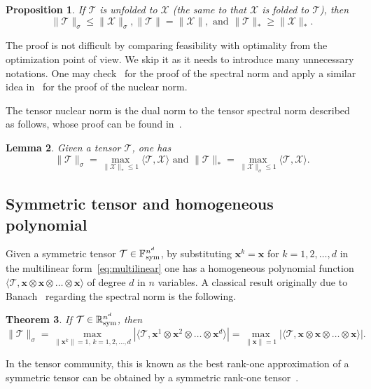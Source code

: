 \documentclass[11pt]{article}
\newtheorem{theorem}{Theorem}[section]
\newtheorem{lemma}[theorem]{Lemma}
\newtheorem{proposition}[theorem]{Proposition}
\newcommand{\R}{\mathbb{R}}
\newcommand{\BF}{\mathbb{F}\:\!}
\newcommand{\X}{\mathcal{X}}
\newcommand{\TT}{\mathcal{T}}
\newcommand{\bx}{\boldsymbol{x}}
\newcommand{\sym}{\textnormal{sym}}
\begin{document}
\begin{proposition}\label{thm:fold}
If $\TT$ is unfolded to $\X$ (the same to that $\X$ is folded to $\TT$), then
$$
\|\TT\|_\sigma\le\|\X\|_\sigma,
\|\TT\|=\|\X\|,\mbox{ and }
\|\TT\|_*\ge\|\X\|_*.
$$
\end{proposition}
The proof is not difficult by comparing feasibility with optimality from the optimization point of view. We skip it as it needs to introduce many unnecessary notations. One may check~\cite[Proposition 4.1]{WDFS17} for the proof of the spectral norm and apply a similar idea in~\cite[Proposition 4.1]{H15} for the proof of the nuclear norm.

The tensor nuclear norm is the dual norm to the tensor spectral norm described as follows, whose proof can be found in~\cite{LC14}.
\begin{lemma} \label{thm:dual}
Given a tensor $\TT$, one has %
$$
    \|\TT\|_\sigma=\max_{\|\X\|_*\le 1}\langle\TT,\X\rangle \mbox{ and }
    \|\TT\|_*=\max_{\|\X\|_\sigma\le 1}\langle\TT,\X\rangle.
$$
\end{lemma}

\subsection{Symmetric tensor and homogeneous polynomial}\label{sec:sym}

Given a symmetric tensor $\TT\in\BF^{n^d}_\sym$, by substituting $\bx^k=\bx$ for $k=1,2,\dots,d$ in the multilinear form~\eqref{eq:multilinear} one has a homogeneous polynomial function $\langle\TT,\bx\otimes \bx\otimes\dots\otimes \bx\rangle$ of degree $d$ in $n$ variables. A classical result originally due to Banach~\cite{B38} regarding the spectral norm is the following.
\begin{theorem}\label{thm:banach}
If $\TT\in\R^{n^d}_\sym$, then
$$
\|\TT\|_\sigma=\max_{\|\bx^k\|=1,\,k=1,2,\dots,d} |\langle \TT, \bx^1\otimes\bx^2\otimes \dots\otimes \bx^d \rangle|=\max_{\|\bx\|=1} |\langle \TT, \bx\otimes\bx\otimes \dots\otimes \bx \rangle|.
$$
\end{theorem}
In the tensor community, this is known as the best rank-one approximation of a symmetric tensor can be obtained by a symmetric rank-one tensor~\cite{CHLZ12,ZLQ12}.
\end{document}
